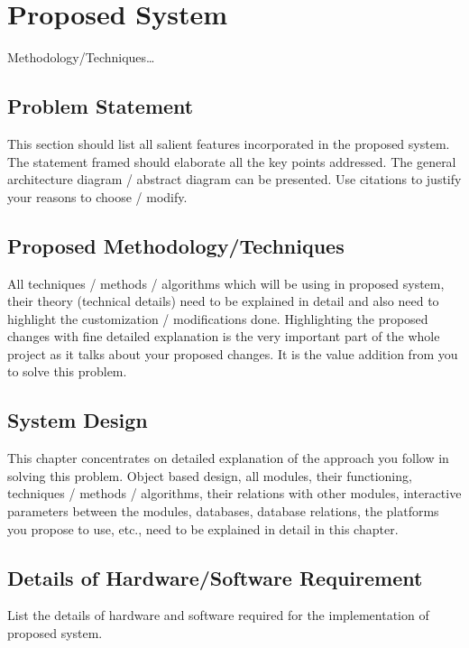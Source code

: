  \chapter{Proposed System}
 
 Methodology/Techniques…
 
\section{Problem Statement}
This section should list all salient features incorporated in the proposed system. The statement framed should elaborate all the key points addressed. The general architecture diagram / abstract diagram can be presented. Use citations to justify your reasons to choose / modify.



\section{Proposed Methodology/Techniques}

All techniques / methods / algorithms which will be using in proposed system, their theory (technical details) need to be explained in detail and also need to highlight the customization / modifications done. Highlighting the proposed changes with fine detailed explanation is the very important part of the whole project as it talks about your proposed changes. It is the value addition from you to solve this problem.

\section{System Design}

This chapter concentrates on detailed explanation of the approach you follow in solving this problem. Object based design, all modules, their functioning, techniques / methods / algorithms, their relations with other modules, interactive parameters between the modules, databases, database relations, the platforms you propose to use, etc., need to be explained in detail in this chapter.

\section{Details of Hardware/Software Requirement}

List the details of hardware and software required for the implementation of proposed system.




